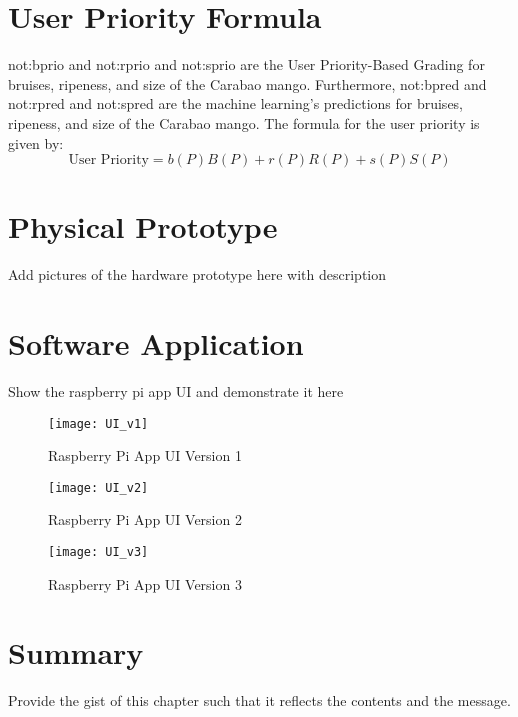 \section{User Priority Formula} \label{sec:userPriorityFormula}
\gls{not:bprio} and \gls{not:rprio} and \gls{not:sprio} are the \gls{User Priority-Based Grading} for bruises, ripeness, and size of the Carabao mango. 
Furthermore, \gls{not:bpred} and \gls{not:rpred} and \gls{not:spred} are the machine learning's predictions for bruises, ripeness, and size of the Carabao mango.
The formula for the user priority is given by:
\begin{equation}
	\label{eq:userPriority}
	\text{User Priority} = \ensuremath{b \left( P \right)  B\left( P \right) + r \left( P \right) R\left( P \right) + s \left( P \right) S\left( P \right)}
\end{equation}


\section{Physical Prototype} \label{sec:physicalPrototype}

Add pictures of the hardware prototype here with description

\section{Software Application}

Show the raspberry pi app UI and demonstrate it here 

\begin{figure}[!htbp]
	\centering
	\texttt{[image: UI\_v1]}
	\caption{Raspberry Pi App UI Version 1}
	\label{fig:app_v1_fig}
\end{figure}

\begin{figure}[!htbp]
	\centering
	\texttt{[image: UI\_v2]}
	\caption{Raspberry Pi App UI Version 2}
	\label{fig:app_v2_fig}
\end{figure}

\begin{figure}[!htbp]
	\centering
	\texttt{[image: UI\_v3]}
	\caption{Raspberry Pi App UI Version 3}
	\label{fig:app_v3_fig}
\end{figure}

\section{Summary} \label{sec:summary_results_and_discussions}

Provide the gist of this chapter such that it reflects the contents and the message.
